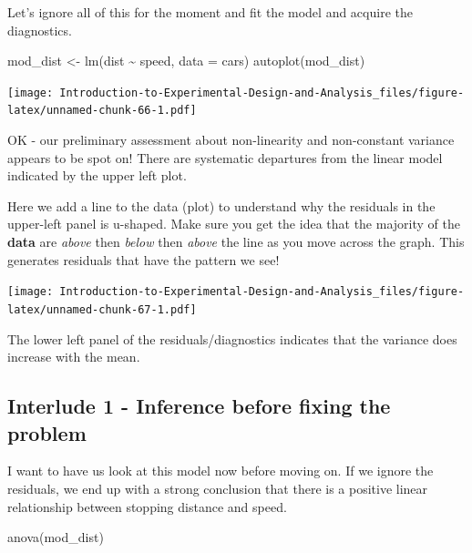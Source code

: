 \documentclass[
]{book}
\newenvironment{Shaded}{\begin{snugshade}}{\end{snugshade}}
\newcommand{\AttributeTok}[1]{\textcolor[rgb]{0.77,0.63,0.00}{#1}}
\newcommand{\FunctionTok}[1]{\textcolor[rgb]{0.00,0.00,0.00}{#1}}
\newcommand{\NormalTok}[1]{#1}
\newcommand{\OtherTok}[1]{\textcolor[rgb]{0.56,0.35,0.01}{#1}}
\newcommand{\SpecialCharTok}[1]{\textcolor[rgb]{0.00,0.00,0.00}{#1}}
\begin{document}
Let's ignore all of this for the moment and fit the model and acquire the diagnostics.

\begin{Shaded}
\begin{Highlighting}[]
\NormalTok{mod\_dist }\OtherTok{\textless{}{-}} \FunctionTok{lm}\NormalTok{(dist }\SpecialCharTok{\textasciitilde{}}\NormalTok{ speed, }\AttributeTok{data =}\NormalTok{ cars)}
\FunctionTok{autoplot}\NormalTok{(mod\_dist)}
\end{Highlighting}
\end{Shaded}

\texttt{[image: Introduction-to-Experimental-Design-and-Analysis\_files/figure-latex/unnamed-chunk-66-1.pdf]}

OK - our preliminary assessment about non-linearity and non-constant variance appears to be spot on! There are systematic departures from the linear model indicated by the upper left plot.

Here we add a line to the data (plot) to understand why the residuals in the upper-left panel is u-shaped. Make sure you get the idea that the majority of the \textbf{data} are \emph{above} then \emph{below} then \emph{above} the line as you move across the graph. This generates residuals that have the pattern we see!

\texttt{[image: Introduction-to-Experimental-Design-and-Analysis\_files/figure-latex/unnamed-chunk-67-1.pdf]}

The lower left panel of the residuals/diagnostics indicates that the variance does increase with the mean.

\hypertarget{interlude-1---inference-before-fixing-the-problem}{%
\subsection{Interlude 1 - Inference before fixing the problem}\label{interlude-1---inference-before-fixing-the-problem}}

I want to have us look at this model now before moving on. If we ignore the residuals, we end up with a strong conclusion that there is a positive linear relationship between stopping distance and speed.

\begin{Shaded}
\begin{Highlighting}[]
\FunctionTok{anova}\NormalTok{(mod\_dist)}
\end{Highlighting}
\end{Shaded}
\end{document}
